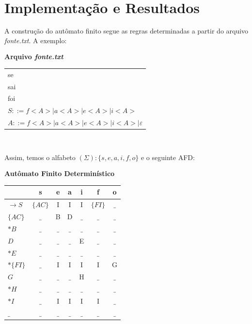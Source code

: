 \documentclass[12pt, a4paper]{article}
\begin{document}
\section{Implementação e Resultados}
	A construção do autômato finito segue as regras determinadas a partir do arquivo \textit{fonte.txt}. A exemplo:\\

\begin{center}
	\textbf{Arquivo \textit{fonte.txt}}\\
\begin{tabular}{|>{\raggedright\arraybackslash}p{8.5cm}|} 
\toprule
se\\
sai\\
foi\\
$S::=f<A>|a<A>|e<A>|i<A>$\\
$A::=f<A>|a<A>|e<A>|i<A>|\varepsilon$\\
\bottomrule
\end{tabular}
\\
\end{center}

	Assim, temos o alfabeto $(\Sigma): \{s, e, a, i, f, o\}$ e o seguinte AFD:
\begin{center}
	\textbf{Autômato Finito Determinístico}\\
\begin{tabular}{|>{\raggedright\arraybackslash}p{1cm}|c|c|c|c|c|c|} 
    \toprule 
    & s & e & a & i & f & o \\
    \midrule 
    $\to S $   & $\{AC\}$ & I    & I    & I    & $\{FI\}$ & $\_$ \\
    $\{AC\}$   & $\_$     & B    & D    & $\_$ & $\_$     & $\_$ \\
    $*B$       & $\_$     & $\_$ & $\_$ & $\_$ & $\_$     & $\_$ \\
    $D$        & $\_$     & $\_$ & $\_$ & E    & $\_$     & $\_$ \\
    $*E$       & $\_$     & $\_$ & $\_$ & $\_$ & $\_$     & $\_$ \\
    $*\{FI\}$  & $\_$     & I    & I    & I    & I        & G    \\
    $G$        & $\_$     & $\_$ & $\_$ & H    & $\_$     & $\_$ \\
    $*H$       & $\_$     & $\_$ & $\_$ & $\_$ & $\_$     & $\_$ \\
    $*I$       & $\_$     & I    & I    & I    & I        & $\_$ \\
    $\_$       & $\_$     & $\_$ & $\_$ & $\_$ & $\_$     & $\_$ \\
    \bottomrule 
\end{tabular}
\end{center}
\end{document}
